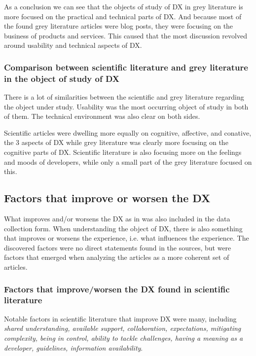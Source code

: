\documentclass[english, 12pt, a4paper, sci, utf8, a-1b, online]{aaltothesis}
\begin{document}
As a conclusion we can see that the objects of study of DX in grey literature is more focused on the practical and technical parts of DX. And because most of the found grey literature articles were blog posts, they were focusing on the business of products and services. This caused that the most discussion revolved around usability and technical aspects of DX.

\subsubsection{Comparison between scientific literature and grey literature in the object of study of DX}

There is a lot of similarities between the scientific and grey literature regarding the object under study. Usability was the most occurring object of study in both of them. The technical environment was also clear on both sides.

Scientific articles were dwelling more equally on cognitive, affective, and conative, the 3 aspects of DX while grey literature was clearly more focusing on the cognitive parts of DX. Scientific literature is also focusing more on the feelings and moods of developers, while only a small part of the grey literature focused on this.

\subsection{Factors that improve or worsen the DX}

What improves and/or worsens the DX as in \textcite{fagerholm-doctoral-thesis} was also included in the data collection form. When understanding the object of DX, there is also something that improves or worsens the experience, i.e. what influences the experience. The discovered factors were no direct statements found in the sources, but were factors that emerged when analyzing the articles as a more coherent set of articles.

\subsubsection{Factors that improve/worsen the DX found in scientific literature}

Notable factors in scientific literature that improve DX were many, including \textit{shared understanding,	available support, collaboration, expectations, mitigating complexity, being in control, ability to tackle challenges, having a meaning as a developer, guidelines, information availability}.
\end{document}
